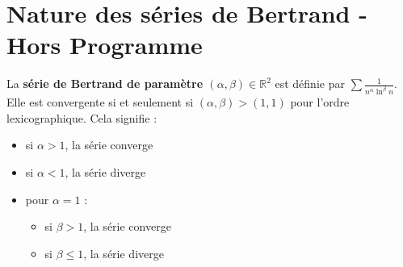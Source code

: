 \documentclass[../main.tex]{subfiles}
\begin{document}
\section{Nature des séries de Bertrand - Hors Programme}
\begin{tcolorbox}[title=Propostion 27.32 - HP, title filled=false, colframe=lightblue, colback=lightblue!10!white]
    La \textbf{série de Bertrand de paramètre $(\alpha, \beta)\in \mathbb{R}^2$} est définie par $\sum \frac{1}{n^{\alpha} \ln^{\beta} n}$. Elle est convergente si et seulement si $(\alpha, \beta) > (1, 1)$ pour l'ordre lexicographique. Cela signifie : 
    \begin{itemize}
        \item si $\alpha > 1$, la série converge
        \item si $\alpha < 1$, la série diverge
        \item pour $\alpha = 1$ : 
        \begin{itemize}
            \item si $\beta > 1$, la série converge
            \item si $\beta \leq 1$, la série diverge
        \end{itemize}
    \end{itemize}
\end{tcolorbox}
\end{document}

